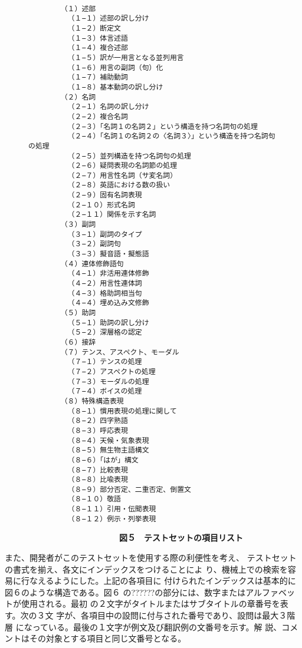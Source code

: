 \begin{figure}
\begin{footnotesize}
\begin{verbatim}

　　　　 （１）述部
　　　　　 （１−１）述部の訳し分け
　　　　　 （１−２）断定文
　　　　　 （１−３）体言述語
　　　　　 （１−４）複合述部
　　　　　 （１−５）訳が一用言となる並列用言
　　　　　 （１−６）用言の副詞（句）化
　　　　　 （１−７）補助動詞
　　　　　 （１−８）基本動詞の訳し分け
　　　　 （２）名詞
　　　　　 （２−１）名詞の訳し分け
　　　　　 （２−２）複合名詞
　　　　　 （２−３）「名詞１の名詞２」という構造を持つ名詞句の処理
　　　　　 （２−４）「名詞１の名詞２の〈名詞３〉」という構造を持つ名詞句の処理
　　　　　 （２−５）並列構造を持つ名詞句の処理
　　　　　 （２−６）疑問表現の名詞節の処理
　　　　　 （２−７）用言性名詞（サ変名詞）
　　　　　 （２−８）英語における数の扱い
　　　　　 （２−９）固有名詞表現
　　　　　 （２−１０）形式名詞
　　　　　 （２−１１）関係を示す名詞
　　　　 （３）副詞
　　　　　 （３−１）副詞のタイプ
　　　　　 （３−２）副詞句
　　　　　 （３−３）擬音語・擬態語
　　　　 （４）連体修飾語句
　　　　　 （４−１）非活用連体修飾
　　　　　 （４−２）用言性連体詞
　　　　　 （４−３）格助詞相当句
　　　　　 （４−４）埋め込み文修飾
　　　　 （５）助詞
　　　　　 （５−１）助詞の訳し分け
　　　　　 （５−２）深層格の認定
　　　　 （６）接辞
　　　　 （７）テンス、アスペクト、モーダル
　　　　　 （７−１）テンスの処理
　　　　　 （７−２）アスペクトの処理
　　　　　 （７−３）モーダルの処理
　　　　　 （７−４）ボイスの処理
　　　　 （８）特殊構造表現
　　　　　 （８−１）慣用表現の処理に関して
　　　　　 （８−２）四字熟語
　　　　　 （８−３）呼応表現
　　　　　 （８−４）天候・気象表現
　　　　　 （８−５）無生物主語構文
　　　　　 （８−６）「はが」構文
　　　　　 （８−７）比較表現
　　　　　 （８−８）比喩表現
　　　　　 （８−９）部分否定、二重否定、倒置文
　　　　　 （８−１０）敬語
　　　　　 （８−１１）引用・伝聞表現
　　　　　 （８−１２）例示・列挙表現

\end{verbatim}
\end{footnotesize}
{\bf　　　　　　　　　　　図５　テストセットの項目リスト}

\end{figure}

また、開発者がこのテストセットを使用する際の利便性を考え、
テストセットの書式を揃え、各文にインデックスをつけることによ
り、機械上での検索を容易に行なえるようにした。上記の各項目に
付けられたインデックスは基本的に図６のような構造である。図６
の??????の部分には、数字またはアルファベットが使用される。最初
の２文字がタイトルまたはサブタイトルの章番号を表す。次の３文
字が、各項目中の設問に付与された番号であり、設問は最大３階層
になっている。最後の１文字が例文及び翻訳例の文番号を示す。解
説、コメントはその対象とする項目と同じ文番号となる。

